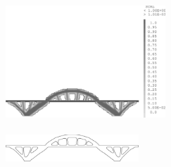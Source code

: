 \begin{frame}{}
\begin{itemize}
{\begin{textblock*}{5cm}
\begin{center}
          \else
            \includegraphics[width=6cm]{images/topoptim/topoptim.100}\\~\\
          \fi
          \includegraphics[width=5cm]{images/topoptim/toposurf}\\
          \tiny{}
        \end{center}
      \end{textblock*}
      }
  \end{itemize}
\end{frame}

